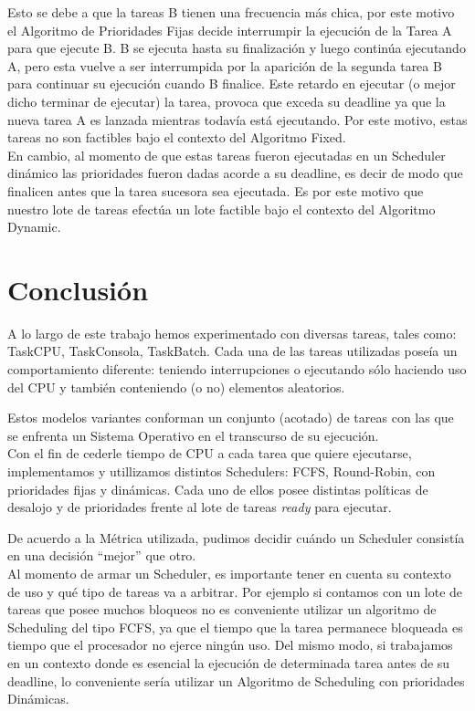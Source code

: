 \documentclass[a4paper]{article}
\begin{document}
Esto se debe a que la tareas B tienen una frecuencia m\'as chica, por este motivo el Algoritmo de Prioridades Fijas decide interrumpir la ejecuci\'on de la Tarea A para que ejecute B. B se ejecuta hasta su finalizaci\'on y luego contin\'ua ejecutando A, pero esta vuelve a ser interrumpida por la aparici\'on de la segunda tarea B para continuar su ejecuci\'on cuando B finalice. Este retardo en ejecutar (o mejor dicho terminar de ejecutar) la tarea, provoca que exceda su deadline ya que la nueva tarea A es lanzada mientras todav\'ia est\'a ejecutando.  Por este motivo, estas tareas no son factibles bajo el contexto del Algoritmo Fixed.\\

En cambio, al momento de que estas tareas fueron ejecutadas en un Scheduler din\'amico las prioridades fueron dadas acorde a su deadline, es decir de modo que finalicen antes que la tarea sucesora sea ejecutada. Es por este motivo que nuestro lote de tareas efect\'ua un lote factible bajo el contexto del Algoritmo Dynamic.





\newpage
 \section{Conclusión} 

A lo largo de este trabajo hemos experimentado con diversas tareas, tales como: TaskCPU, TaskConsola, TaskBatch. Cada una de las tareas utilizadas pose\'ia un comportamiento diferente: teniendo interrupciones o ejecutando s\'olo haciendo uso del CPU y tambi\'en conteniendo (o no) elementos aleatorios.

Estos modelos variantes conforman un conjunto (acotado) de tareas con las que se enfrenta un Sistema Operativo en el transcurso de su ejecuci\'on.\\

Con el fin de cederle tiempo de CPU a cada tarea que quiere ejecutarse, implementamos y utillizamos distintos Schedulers: FCFS, Round-Robin, con prioridades fijas y din\'amicas. Cada uno de ellos posee distintas pol\'iticas de desalojo y de prioridades frente al lote de tareas \emph{ready} para ejecutar.

De acuerdo a la M\'etrica utilizada, pudimos decidir cu\'ando un Scheduler consist\'ia en una decisi\'on ``mejor'' que otro.\\

Al momento de armar un Scheduler, es importante tener en cuenta su contexto de uso y qu\'e tipo de tareas va a arbitrar. Por ejemplo si contamos con un lote de tareas que posee muchos bloqueos no es conveniente utilizar un algoritmo de Scheduling del tipo FCFS, ya que el tiempo que la tarea permanece bloqueada es tiempo que el procesador no ejerce ning\'un uso. Del mismo modo, si trabajamos en un contexto donde es esencial la ejecuci\'on de determinada tarea antes de su deadline, lo conveniente ser\'ia utilizar un Algoritmo de Scheduling con prioridades Din\'amicas.\\
\end{document}
